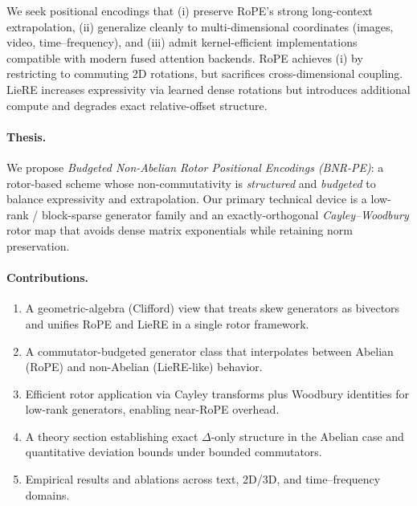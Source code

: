We seek positional encodings that (i) preserve RoPE's strong long-context extrapolation, (ii) generalize cleanly to multi-dimensional coordinates (images, video, time--frequency), and (iii) admit kernel-efficient implementations compatible with modern fused attention backends.
RoPE achieves (i) by restricting to commuting 2D rotations, but sacrifices cross-dimensional coupling.
LieRE increases expressivity via learned dense rotations but introduces additional compute and degrades exact relative-offset structure.

\paragraph{Thesis.}
We propose \emph{Budgeted Non-Abelian Rotor Positional Encodings (BNR-PE)}: a rotor-based scheme whose non-commutativity is \emph{structured} and \emph{budgeted} to balance expressivity and extrapolation.
Our primary technical device is a low-rank / block-sparse generator family and an exactly-orthogonal \emph{Cayley--Woodbury} rotor map that avoids dense matrix exponentials while retaining norm preservation.

\paragraph{Contributions.}
\begin{enumerate}
  \item A geometric-algebra (Clifford) view that treats skew generators as bivectors and unifies RoPE and LieRE in a single rotor framework.
  \item A commutator-budgeted generator class that interpolates between Abelian (RoPE) and non-Abelian (LieRE-like) behavior.
  \item Efficient rotor application via Cayley transforms plus Woodbury identities for low-rank generators, enabling near-RoPE overhead.
  \item A theory section establishing exact $\Delta$-only structure in the Abelian case and quantitative deviation bounds under bounded commutators.
  \item Empirical results and ablations across text, 2D/3D, and time--frequency domains.
\end{enumerate}
